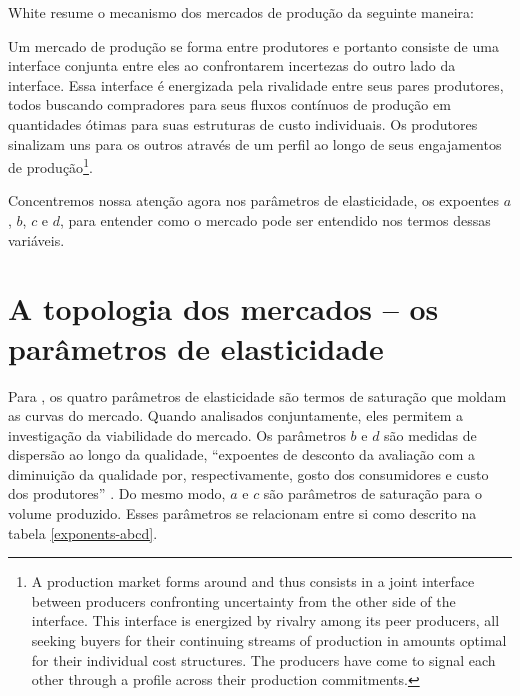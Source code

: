 \documentclass[a4paper, 12pt, openright, oneside, german, french, english, brazil]{abntex2}
\begin{document}
	White resume o mecanismo dos mercados de produção da seguinte maneira:

	\begin{citacao}
		Um mercado de produção se forma entre produtores e portanto consiste de uma interface conjunta entre eles ao confrontarem incertezas do outro lado da interface. Essa interface é energizada pela rivalidade entre seus pares produtores, todos buscando compradores para seus fluxos contínuos de produção em quantidades ótimas para suas estruturas de custo individuais. Os produtores sinalizam uns para os outros através de um perfil ao longo de seus engajamentos de produção\footnote{A production market forms around and thus consists in a joint interface between producers confronting uncertainty from the other side of the interface. This interface is energized by rivalry among its peer producers, all seeking buyers for their continuing streams of production in amounts optimal for their individual cost structures. The producers have come to signal each other through a profile across their production commitments.}. \cite[p. 27]{white2002markets}
	\end{citacao}

	Concentremos nossa atenção agora nos parâmetros de elasticidade, os expoentes $a$, $b$, $c$ e $d$, para entender como o mercado pode ser entendido nos termos dessas variáveis.
	
	
	
	\section{A topologia dos mercados -- os parâmetros de elasticidade}
	
	
	Para , os quatro parâmetros de elasticidade são termos de saturação que moldam as curvas do mercado. Quando analisados conjuntamente, eles permitem a investigação da viabilidade do mercado. Os parâmetros $b$ e $d$ são medidas de dispersão ao longo da qualidade, ``expoentes de desconto da avaliação com a diminuição da qualidade por, respectivamente, gosto dos consumidores e custo dos produtores'' \cite[p. 50]{white2002markets}.  Do mesmo modo, $a$ e $c$ são parâmetros de saturação  para o volume produzido. Esses parâmetros se relacionam entre si como descrito na tabela \ref{exponents-abcd}.
	
\end{document}
